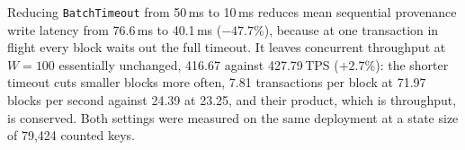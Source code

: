 Reducing \texttt{BatchTimeout} from 50\,ms to 10\,ms reduces mean sequential provenance write latency from 76.6\,ms to 40.1\,ms ($-47.7\%$), because at one transaction in flight every block waits out the full timeout. It leaves concurrent throughput at $W{=}100$ essentially unchanged, 416.67 against 427.79\,TPS ($+2.7\%$): the shorter timeout cuts smaller blocks more often, 7.81 transactions per block at 71.97 blocks per second against 24.39 at 23.25, and their product, which is throughput, is conserved. Both settings were measured on the same deployment at a state size of 79,424 counted keys.
